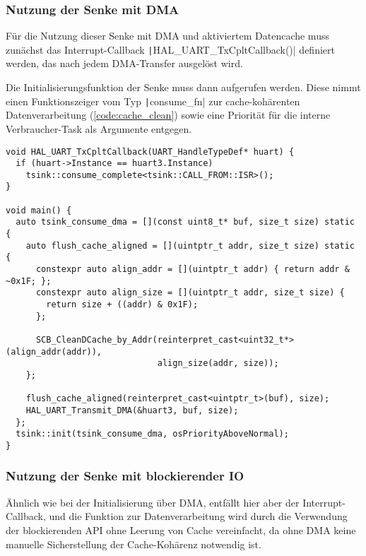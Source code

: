 \subsubsection{Nutzung der Senke mit DMA}

Für die Nutzung dieser Senke mit DMA und aktiviertem Datencache muss zunächst
das Interrupt-Callback \texttt|HAL_UART_TxCpltCallback()| definiert
werden, das nach jedem DMA-Transfer ausgelöst wird.

Die Initialisierungsfunktion der Senke muss dann aufgerufen werden. Diese nimmt
einen Funktionszeiger vom Typ \texttt|consume_fn| zur cache-kohärenten
Datenverarbeitung (\ref{code:cache_clean}) sowie eine Priorität für die interne
Verbraucher-Task als Argumente entgegen.

\begin{code}
\begin{verbatim}
void HAL_UART_TxCpltCallback(UART_HandleTypeDef* huart) {
  if (huart->Instance == huart3.Instance)
    tsink::consume_complete<tsink::CALL_FROM::ISR>();
}

void main() {
  auto tsink_consume_dma = [](const uint8_t* buf, size_t size) static {
    auto flush_cache_aligned = [](uintptr_t addr, size_t size) static {
      constexpr auto align_addr = [](uintptr_t addr) { return addr & ~0x1F; };
      constexpr auto align_size = [](uintptr_t addr, size_t size) {
        return size + ((addr) & 0x1F);
      };

      SCB_CleanDCache_by_Addr(reinterpret_cast<uint32_t*>(align_addr(addr)),
                              align_size(addr, size));
    };

    flush_cache_aligned(reinterpret_cast<uintptr_t>(buf), size);
    HAL_UART_Transmit_DMA(&huart3, buf, size);
  };
  tsink::init(tsink_consume_dma, osPriorityAboveNormal);
}
\end{verbatim}
\end{code}

\subsubsection{Nutzung der Senke mit blockierender IO}

Ähnlich wie bei der Initialisierung über DMA, entfällt hier aber der
Interrupt-Callback, und die Funktion zur Datenverarbeitung wird durch die
Verwendung der blockierenden API ohne Leerung von Cache vereinfacht, da ohne DMA
keine manuelle Sicherstellung der Cache-Kohärenz notwendig ist.

